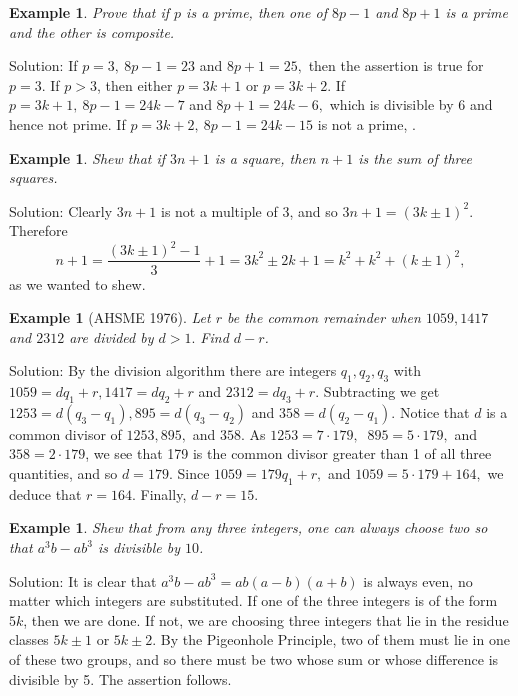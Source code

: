 \documentclass[11pt, openany]{book}
\theoremstyle{change} \theoremheaderfont{\blue\sffamily\bfseries}
\newtheorem{exa}[thm]{Example}
\theoremstyle{nonumberplain} \theoremheaderfont{\sffamily\bfseries}
\newcommand{\í}{\'{\i}}
\begin{document}
\begin{exa}
Prove that if $p$  is a prime, then one of   $8p - 1$ and  $8p +
1$ is a prime and the other is composite.
\end{exa}
Solution: If $p = 3, \  8p - 1 = 23$ and $8p + 1 = 25,$ then the
assertion is true for $p = 3$. If $p > 3$, then either  $p = 3k +
1$ or $p = 3k + 2.$ If $p = 3k + 1, \ 8p - 1 = 24k - 7$ and $8p +
1 = 24k - 6,$ which is divisible by 6 and hence not prime. If $p =
3k + 2, \ 8p - 1 = 24k - 15$ is not a prime, .
\begin{exa}
Shew that if $3n + 1$ is a square, then $n + 1$ is the sum of
three squares.
\end{exa}
Solution: Clearly $3n + 1$ is not a multiple of 3, and so $3n + 1
= (3k \pm 1)^2$. Therefore
$$n + 1 = \frac{(3k \pm 1)^2 - 1}{3} + 1 = 3k^2 \pm 2k + 1 = k^2 + k^2 + (k \pm 1)^2,$$
as we wanted to shew.
\begin{exa}[AHSME 1976]
Let  $r$ be the common remainder when $1059, 1417$ and $2312$ are
divided by $d > 1.$ Find $d - r$.
\end{exa}
Solution: By the division algorithm there are integers $q_1, q_2,
q_3$ with $1059 = dq_1 + r, 1417 = dq_2 + r$ and $2312 = dq_3 +
r$. Subtracting we get $1253 = d(q_3 - q_1), 895 = d(q_3 - q_2)$
and $358 = d(q_2 - q_1)$. Notice that $d$ is a common divisor of
$1253, 895,$ and $358$. As $1253 = 7\cdot 179,\ $ $895 = 5 \cdot
179,$ and  $358 = 2\cdot 179$, we see that 179 is the common
divisor greater than 1 of all three quantities, and so $d = 179.$
Since $1059 = 179q_1 + r,$ and $1059 = 5\cdot 179 + 164,$ we
deduce that $r = 164.$ Finally, $d - r = 15.$
\begin{exa} Shew that from any three integers, one can always choose two so that $a^3 b - ab^3$
is divisible by $10$. \end{exa} Solution: It is clear that $a^3 b -
ab^3 = ab(a - b)(a + b)$ is always even, no matter which integers
are substituted. If one of the three integers is of the form $5k$,
then we are done. If not, we are choosing three integers that lie in
the residue classes $5k \pm 1$ or $5k \pm 2$. By the Pigeonhole
Principle, two of them must lie in one of these two groups, and so
there must be two whose sum or whose difference is divisible by 5.
The assertion follows.
\end{document}
